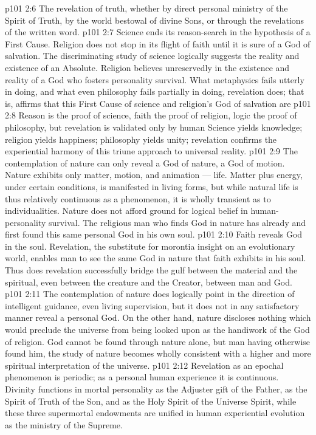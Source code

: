 \vs p101 2:6 \bibnobreakspace The revelation of truth, whether by direct personal ministry of the Spirit of Truth, by the world bestowal of divine Sons, or through the revelations of the written word.
\vs p101 2:7 \pc Science ends its reason\hyp{}search in the hypothesis of a First Cause. Religion does not stop in its flight of faith until it is sure of a God of salvation. The discriminating study of science logically suggests the reality and existence of an Absolute. Religion believes unreservedly in the existence and reality of a God who fosters personality survival. What metaphysics fails utterly in doing, and what even philosophy fails partially in doing, revelation does; that is, affirms that this First Cause of science and religion’s God of salvation are 
\vs p101 2:8 \pc Reason is the proof of science, faith the proof of religion, logic the proof of philosophy, but revelation is validated only by human  Science yields knowledge; religion yields happiness; philosophy yields unity; revelation confirms the experiential harmony of this triune approach to universal reality.
\vs p101 2:9 The contemplation of nature can only reveal a God of nature, a God of motion. Nature exhibits only matter, motion, and animation --- life. Matter plus energy, under certain conditions, is manifested in living forms, but while natural life is thus relatively continuous as a phenomenon, it is wholly transient as to individualities. Nature does not afford ground for logical belief in human\hyp{}personality survival. The religious man who finds God in nature has already and first found this same personal God in his own soul.
\vs p101 2:10 \pc Faith reveals God in the soul. Revelation, the substitute for morontia insight on an evolutionary world, enables man to see the same God in nature that faith exhibits in his soul. Thus does revelation successfully bridge the gulf between the material and the spiritual, even between the creature and the Creator, between man and God.
\vs p101 2:11 The contemplation of nature does logically point in the direction of intelligent guidance, even living supervision, but it does not in any satisfactory manner reveal a personal God. On the other hand, nature discloses nothing which would preclude the universe from being looked upon as the handiwork of the God of religion. God cannot be found through nature alone, but man having otherwise found him, the study of nature becomes wholly consistent with a higher and more spiritual interpretation of the universe.
\vs p101 2:12 \pc Revelation as an epochal phenomenon is periodic; as a personal human experience it is continuous. Divinity functions in mortal personality as the Adjuster gift of the Father, as the Spirit of Truth of the Son, and as the Holy Spirit of the Universe Spirit, while these three supermortal endowments are unified in human experiential evolution as the ministry of the Supreme.
